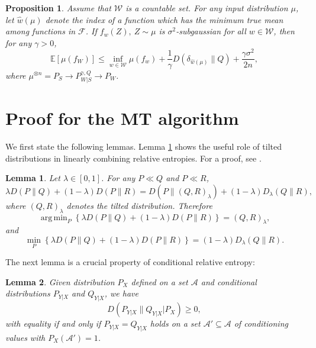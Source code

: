 \documentclass{article}
\DeclareMathOperator*{\argmin}{arg\,min}
\newtheorem{lemma}{Lemma}
\newtheorem{proposition}{Proposition}
\newcommand{\E}{\mathbb{E}}
\newcommand{\W}[0]{\mathcal{W}}
\begin{document}
\begin{proposition}
Assume that $\W$ is a countable set. For any input distribution $\mu$, let $\widehat{w}(\mu)$ denote the index of a function which has the minimum true mean among functions in $\mathcal{F}$. If $f_w(Z),\ Z\sim \mu$ is $\sigma^2$-subgaussian for all $w\in\W$, then for any $\gamma>0$,
	\begin{equation}
		\E\left[\mu(f_W)\right]\leq \inf_{w\in\W}\mu(f_w)+\frac{1}{\gamma}D(\delta_{\widehat{w}(\mu)}\|Q)+\frac{\gamma\sigma^2}{2n}, \nonumber
	\end{equation}
	where $\mu^{\otimes n}=P_S\to P^{\gamma, Q}_{W|S}\to P_W$.
\end{proposition} 

\section{Proof for the MT algorithm}\label{MT procedure proof section}
We first state the following lemmas. Lemma \ref{Tilted Renyi lemma} shows the useful role of tilted distributions in linearly combining relative entropies. For a proof, see \cite[Theorem 30]{van2014renyi}.
\begin{lemma}\label{Tilted Renyi lemma}
Let $\lambda\in [0,1]$. For any $P \ll Q$ and $P\ll R$,
\begin{equation}
	\lambda D(P\|Q)+(1-\lambda)D(P\|R)=D\left(P\|(Q,R)_{\lambda}\right)+(1-\lambda)D_{\lambda}(Q\|R),\nonumber
\end{equation}
where $(Q,R)_{\lambda}$ denotes the tilted distribution.	
Therefore 
\begin{equation}
	 \argmin_{P}  \left\{\lambda D(P\|Q)+(1-\lambda)D(P\|R)\right\}=(Q,R)_{\lambda},\nonumber
\end{equation}
and
\begin{equation}
	\min_P \left\{\lambda D(P\|Q)+(1-\lambda)D(P\|R)\right\}=(1-\lambda)D_{\lambda}(Q\|R).\nonumber
\end{equation}
\end{lemma}
The next lemma is a crucial property of conditional relative entropy:
\begin{lemma}\label{conditional relative entropy positive}
Given distribution $P_X$ defined on a set $\mathcal{A}$ and conditional distributions $P_{Y|X}$ and $Q_{Y|X}$, we have 
\begin{equation}
    D(P_{Y|X}\|Q_{Y|X}|P_X)\geq 0,
\end{equation}
with equality if and only if $P_{Y|X}=Q_{Y|X}$ holds on a set $\mathcal{A}'\subseteq \mathcal{A}$ of conditioning values with $P_X(\mathcal{A}')=1$.
\end{lemma}
\end{document}

